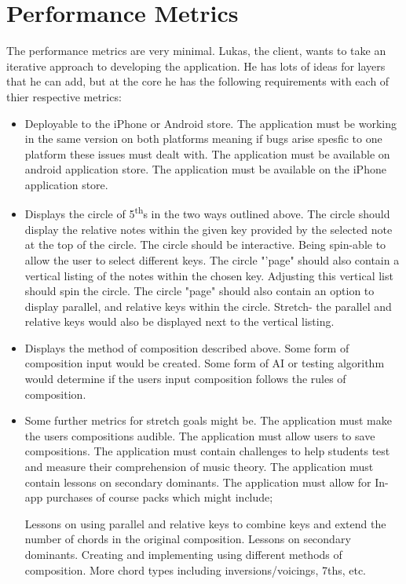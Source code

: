 \documentclass[onecolumn, draftclsnofoot,10pt, compsoc]{IEEEtran}
\begin{document}
    \section{Performance Metrics}
     \par
    The performance metrics are very minimal.
    Lukas, the client, wants to take an iterative approach to developing the application.
    He has lots of ideas for layers that he can add, but at the core he has the following requirements with each of thier respective metrics:
    \begin{itemize}
	\item Deployable to the iPhone or Android store.
		\subitem The application must be working in the same version on both platforms meaning if bugs arise spesfic to one platform these issues must dealt with.
		\subitem The application must be available on android application store.
		\subitem The application must be available on the iPhone application store.
	\item Displays the circle of 5\textsuperscript{th}s in the two ways outlined above.
		\subitem The circle should display the relative notes within the given key provided by the selected note at the top of the circle.
		\subitem The circle should be interactive. Being spin-able to allow the user to select different keys.
		\subitem The circle "'page" should also contain a vertical listing of the notes within the chosen key.
		\subitem Adjusting this vertical list should spin the circle.
		\subitem The circle "page" should also contain an option to display parallel, and relative keys within the circle.
		\subitem Stretch- the parallel and relative keys would also be displayed next to the vertical listing.
	\item Displays the method of composition described above.
		\subitem Some form of composition input would be created.
		\subitem Some form of AI or testing algorithm would determine if the users input composition follows the rules of composition.
	\item Some further metrics for stretch goals might be.
		\subitem The application must make the users compositions audible.
		\subitem The application must allow users to save compositions.
		\subitem The application must contain challenges to help students test and measure their comprehension of music theory.
		\subitem The application must contain lessons on secondary dominants.
		\subitem The application must allow for In-app purchases of course packs which might include;
		\begin{itemize}
			\subitem Lessons on using parallel and relative keys to combine keys and extend the number of chords in the original composition.
			\subitem Lessons on secondary dominants.
			\subitem Creating and implementing using different methods of composition.
			\subitem More chord types including inversions/voicings, 7ths, etc.
		\end {itemize}
	\end {itemize}
    

    
    
\end{document}
